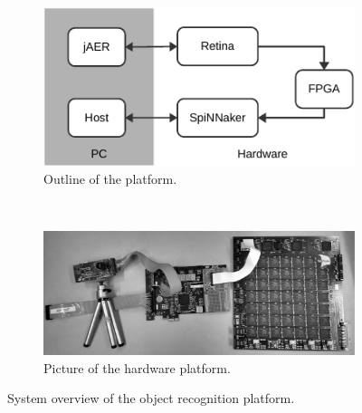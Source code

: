 \documentclass[journal]{journal}
\begin{document}
\begin{figure}[h!]
\centering
	\begin{subfigure}[t]{0.38\textwidth}
		\includegraphics[width=\textwidth]{pics/outline.pdf}
	    \caption{Outline of the platform.}
	    \label{fig:SysOverViewa}
	\end{subfigure}
	\\
	\begin{subfigure}[t]{0.4\textwidth}
		\includegraphics[width=\textwidth]{pics/outline2.pdf}	    \caption{Picture of the hardware platform. %
		}
	    \label{fig:SysOverViewb}
	\end{subfigure}	

\caption{System overview of the object recognition platform. 
}
\label{fig:SysOverView}
\end{figure}
\end{document}
